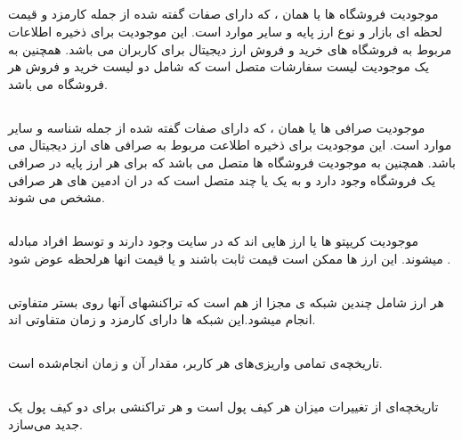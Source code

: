 \documentclass{book}
\begin{document}
\subsection{}
موجودیت فروشگاه ها یا همان ، که دارای صفات گفته شده از جمله کارمزد و  قیمت لحظه ای بازار و نوع ارز پایه و سایر موارد است. این موجودیت برای ذخیره اطلاعات مربوط به فروشگاه های خرید و فروش ارز دیجیتال برای کاربران می باشد. همچنین به یک موجودیت لیست سفارشات متصل است که شامل دو لیست خرید و فروش هر فروشگاه می باشد.







\subsection{}
موجودیت صرافی ها یا همان ، که دارای صفات گفته شده از جمله شناسه و سایر موارد است. این موجودیت برای ذخیره اطلاعت مربوط به صرافی های ارز دیجیتال می باشد. همچنین به موجودیت فروشگاه ها متصل می باشد که برای هر ارز پایه در صرافی یک فروشگاه وجود دارد و به یک یا چند  متصل است که در ان ادمین های هر صرافی مشخص می شوند.
\subsection{}
موجودیت کریپتو ها یا   ارز هایی اند که در سایت وجود دارند و توسط افراد مبادله میشوند. این ارز ها ممکن است قیمت ثابت باشند و یا قیمت انها هرلحظه عوض شود .

\subsection{}

هر ارز شامل چندین شبکه ی مجزا از هم است که تراکنشهای آنها روی بستر متفاوتی انجام میشود.این شبکه ها دارای کارمزد و زمان متفاوتی اند.

\subsection{}
تاریخچه‌ی تمامی واریزی‌های هر کاربر، مقدار آن و زمان انجام‌شده است.


\subsection{}
تاریخچه‌ای از تغییرات میزان هر کیف پول است و هر تراکنشی برای دو کیف پول یک  جدید می‌سازد.
\end{document}
